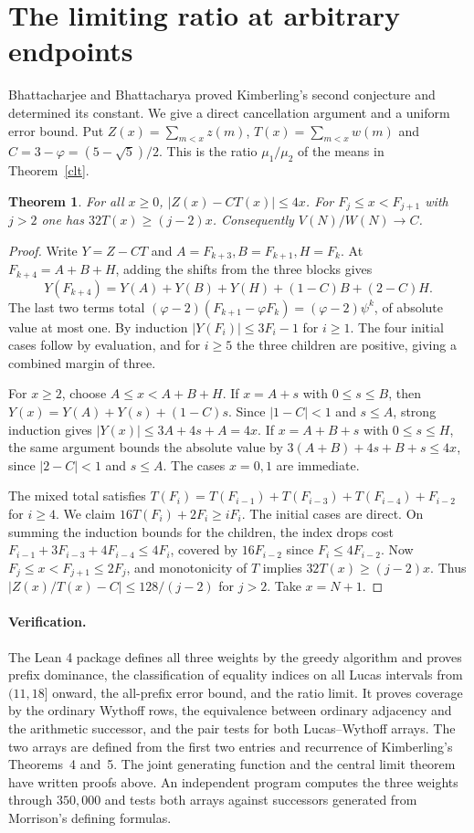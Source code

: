 \documentclass[10pt]{article}
\newtheorem{theorem}{Theorem}[section]
\newcommand{\ph}{\varphi}
\begin{document}
\section{The limiting ratio at arbitrary endpoints}
Bhattacharjee and Bhattacharya \cite{bb} proved Kimberling's second conjecture and determined its constant. We give a direct cancellation argument and a uniform error bound. Put $Z(x)=\sum_{m<x}z(m)$, $T(x)=\sum_{m<x}w(m)$ and $C=3-\ph=(5-\sqrt5)/2$. This is the ratio $\mu_1/\mu_2$ of the means in Theorem~\ref{clt}.
\begin{theorem}\label{ratio}
For all $x\ge0$, $|Z(x)-CT(x)|\le4x$. For $F_j\le x<F_{j+1}$ with $j>2$ one has $32T(x)\ge(j-2)x$. Consequently $V(N)/W(N)\to C$.
\end{theorem}
\begin{proof}
Write $Y=Z-CT$ and $A=F_{k+3},B=F_{k+1},H=F_k$. At $F_{k+4}=A+B+H$, adding the shifts from the three blocks gives
\[
 Y(F_{k+4})=Y(A)+Y(B)+Y(H)+(1-C)B+(2-C)H.
\]
The last two terms total $(\ph-2)(F_{k+1}-\ph F_k)=(\ph-2)\psi^k$, of absolute value at most one. By induction $|Y(F_i)|\le3F_i-1$ for $i\ge1$. The four initial cases follow by evaluation, and for $i\ge5$ the three children are positive, giving a combined margin of three.

For $x\ge2$, choose $A\le x<A+B+H$. If $x=A+s$ with $0\le s\le B$, then $Y(x)=Y(A)+Y(s)+(1-C)s$. Since $|1-C|<1$ and $s\le A$, strong induction gives $|Y(x)|\le3A+4s+A=4x$. If $x=A+B+s$ with $0\le s\le H$, the same argument bounds the absolute value by $3(A+B)+4s+B+s\le4x$, since $|2-C|<1$ and $s\le A$. The cases $x=0,1$ are immediate.

The mixed total satisfies $T(F_i)=T(F_{i-1})+T(F_{i-3})+T(F_{i-4})+F_{i-2}$ for $i\ge4$. We claim $16T(F_i)+2F_i\ge iF_i$. The initial cases are direct. On summing the induction bounds for the children, the index drops cost $F_{i-1}+3F_{i-3}+4F_{i-4}\le4F_i$, covered by $16F_{i-2}$ since $F_i\le4F_{i-2}$. Now $F_j\le x<F_{j+1}\le2F_j$, and monotonicity of $T$ implies $32T(x)\ge(j-2)x$. Thus $|Z(x)/T(x)-C|\le128/(j-2)$ for $j>2$. Take $x=N+1$.
\end{proof}

\paragraph{Verification.}
The Lean 4 package defines all three weights by the greedy algorithm and proves prefix dominance, the classification of equality indices on all Lucas intervals from $(11,18]$ onward, the all-prefix error bound, and the ratio limit. It proves coverage by the ordinary Wythoff rows, the equivalence between ordinary adjacency and the arithmetic successor, and the pair tests for both Lucas--Wythoff arrays. The two arrays are defined from the first two entries and recurrence of Kimberling's Theorems~4 and~5. The joint generating function and the central limit theorem have written proofs above. An independent program computes the three weights through $350{,}000$ and tests both arrays against successors generated from Morrison's defining formulas.
\end{document}
